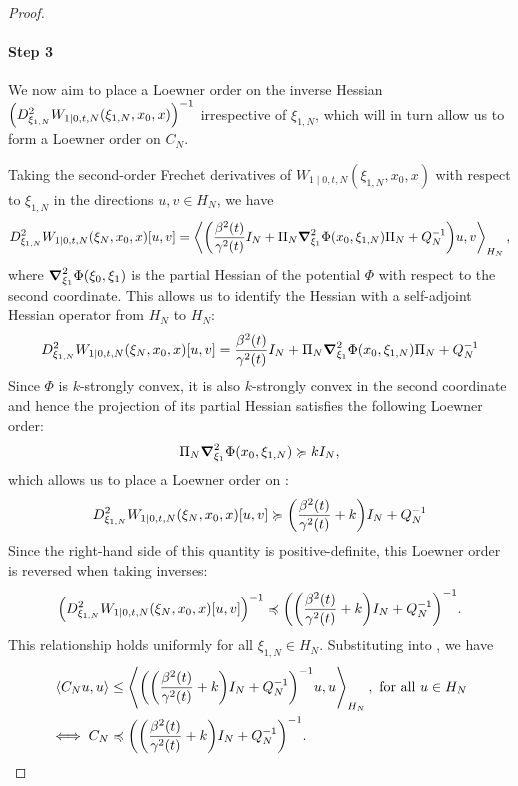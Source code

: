 \begin{proof}
  \paragraph{Step 3}
  We now aim to place a Loewner order on the inverse Hessian \(\qty(D^{2}_{\xi_{1, N}}W_{1 \mid 0, t, N}(\xi_{1, N}, x_{0}, x))^{-1}\) irrespective of \(\xi_{1, N}\), which will in turn allow us to form a Loewner order on \(C_{N}\).

  Taking the second-order Frechet derivatives of \(W_{1 \mid 0, t,N}(\xi_{1, N}, x_{0}, x)\) with respect to \(\xi_{1, N}\) in the directions \(u, v \in H_{N}\), we have
  \begin{align*}
    D^{2}_{\xi_{1, N}}W_{1 \mid 0, t, N}(\xi_{N}, x_{0}, x)[u, v] = \ev{\qty(\frac{\beta^{2}(t)}{\gamma^{2}(t)} I_{N} + \Pi_{N}\grad_{\xi_{1}}^{2}\Phi(x_{0}, \xi_{1, N})\Pi_{N} + Q_{N}^{-1})u, v}_{H_{N}},
  \end{align*}
  where \(\grad_{\xi_{1}}^{2} \Phi(\xi_{0}, \xi_{1})\) is the partial Hessian of the potential \(\Phi\) with respect to the second coordinate. This allows us to identify the Hessian with a self-adjoint Hessian operator from \(H_{N}\) to \(H_{N}\):
  \begin{equation}
    D^{2}_{\xi_{1, N}}W_{1 \mid 0, t, N}(\xi_{N}, x_{0}, x)[u, v] = \frac{\beta^{2}(t)}{\gamma^{2}(t)} I_{N} + \Pi_{N}\grad_{\xi_{1}}^{2}\Phi(x_{0}, \xi_{1, N})\Pi_{N} + Q_{N}^{-1}\label{eqn:hess}
  \end{equation}
  Since \(\Phi\) is \(k\)-strongly convex, it is also \(k\)-strongly convex in the second coordinate and hence the projection of its partial Hessian satisfies the following Loewner order:
  \[
    \Pi_{N} \grad^{2}_{\xi_{1}} \Phi(x_{0}, \xi_{1, N}) \succcurlyeq k I_{N},
  \]
  which allows us to place a Loewner order on :
  \[
    D^{2}_{\xi_{1, N}}W_{1 \mid 0, t, N}(\xi_{N}, x_{0}, x)[u, v] \succcurlyeq \qty(\frac{\beta^{2}(t)}{\gamma^{2}(t)} + k) I_{N} + Q_{N}^{-1}
  \]
  Since the right-hand side of this quantity is positive-definite, this Loewner order is reversed when taking inverses:
  \[
    \qty(D^{2}_{\xi_{1, N}}W_{1 \mid 0, t, N}(\xi_{N}, x_{0}, x)[u, v])^{-1} \preccurlyeq \qty(\qty(\frac{\beta^{2}(t)}{\gamma^{2}(t)} + k) I_{N} + Q_{N}^{-1})^{-1}.
  \]
  This relationship holds uniformly for all \(\xi_{1, N} \in H_{N}\). Substituting into , we have
  \begin{align*}
    \ev{C_{N}u, u} &\leq \ev{\qty(\qty(\frac{\beta^{2}(t)}{\gamma^{2}(t)} + k) I_{N} + Q_{N}^{-1})^{-1}u, u}_{H_{N}}, \text{ for all } u \in H_{N}\\
    \iff C_{N} &\preccurlyeq \qty(\qty(\frac{\beta^{2}(t)}{\gamma^{2}(t)} + k) I_{N} + Q_{N}^{-1})^{-1}.
  \end{align*}

\end{proof}
